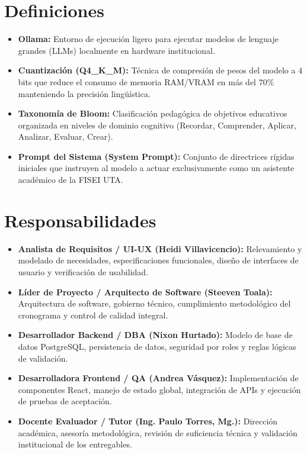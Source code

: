 \documentclass[12pt,a4paper]{article}
\begin{document}
\section{Definiciones}
\begin{itemize}[leftmargin=1.5em, itemsep=2pt]
    \item \textbf{Ollama:} Entorno de ejecución ligero para ejecutar modelos de lenguaje grandes (LLMs) localmente en hardware institucional.
    \item \textbf{Cuantización (Q4\_K\_M):} Técnica de compresión de pesos del modelo a 4 bits que reduce el consumo de memoria RAM/VRAM en más del 70\% manteniendo la precisión lingüística.
    \item \textbf{Taxonomía de Bloom:} Clasificación pedagógica de objetivos educativos organizada en niveles de dominio cognitivo (Recordar, Comprender, Aplicar, Analizar, Evaluar, Crear).
    \item \textbf{Prompt del Sistema (System Prompt):} Conjunto de directrices rígidas iniciales que instruyen al modelo a actuar exclusivamente como un asistente académico de la FISEI UTA.
\end{itemize}

\section{Responsabilidades}
\begin{itemize}[leftmargin=1.5em, itemsep=2pt]
    \item \textbf{Analista de Requisitos / UI-UX (Heidi Villavicencio):} Relevamiento y modelado de necesidades, especificaciones funcionales, diseño de interfaces de usuario y verificación de usabilidad.
    \item \textbf{Líder de Proyecto / Arquitecto de Software (Steeven Toala):} Arquitectura de software, gobierno técnico, cumplimiento metodológico del cronograma y control de calidad integral.
    \item \textbf{Desarrollador Backend / DBA (Nixon Hurtado):} Modelo de base de datos PostgreSQL, persistencia de datos, seguridad por roles y reglas lógicas de validación.
    \item \textbf{Desarrolladora Frontend / QA (Andrea Vásquez):} Implementación de componentes React, manejo de estado global, integración de APIs y ejecución de pruebas de aceptación.
    \item \textbf{Docente Evaluador / Tutor (Ing. Paulo Torres, Mg.):} Dirección académica, asesoría metodológica, revisión de suficiencia técnica y validación institucional de los entregables.
\end{itemize}
\end{document}
